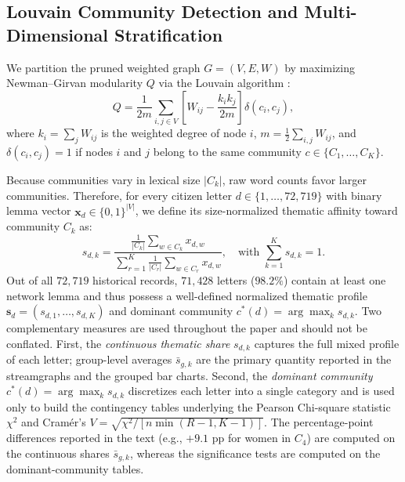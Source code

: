\documentclass[pdflatex,sn-mathphys,iicol]{sn-jnl}
\begin{document}
\subsection{Louvain Community Detection and Multi-Dimensional Stratification}
We partition the pruned weighted graph $G=(V,E,W)$ by maximizing Newman--Girvan modularity $Q$ \citep{newman2006modularity} via the Louvain algorithm \citep{blondel2008fast,cordeiro2016dynamic,traag2019louvain}:
\begin{equation}
    Q = \frac{1}{2m} \sum_{i,j \in V} \left[ W_{ij} - \frac{k_i k_j}{2m} \right] \delta(c_i, c_j),
\end{equation}
where $k_i = \sum_j W_{ij}$ is the weighted degree of node $i$, $m = \frac{1}{2}\sum_{i,j} W_{ij}$, and $\delta(c_i, c_j) = 1$ if nodes $i$ and $j$ belong to the same community $c \in \{C_1, \dots, C_K\}$.

Because communities vary in lexical size $|C_k|$, raw word counts favor larger communities. Therefore, for every citizen letter $d \in \{1, \dots, 72,719\}$ with binary lemma vector $\mathbf{x}_d \in \{0,1\}^{|V|}$, we define its size-normalized thematic affinity toward community $C_k$ as:
\begin{equation}
    s_{d,k} = \frac{\frac{1}{|C_k|} \sum_{w \in C_k} x_{d,w}}{\sum_{r=1}^{K} \frac{1}{|C_r|} \sum_{w \in C_r} x_{d,w}}, \quad \text{with } \sum_{k=1}^{K} s_{d,k} = 1.
\end{equation}
Out of all $72,719$ historical records, $71,428$ letters ($98.2\%$) contain at least one network lemma and thus possess a well-defined normalized thematic profile $\mathbf{s}_d = (s_{d,1}, \dots, s_{d,K})$ and dominant community $c^*(d) = \arg\max_k s_{d,k}$. %
Two complementary measures are used throughout the paper and should not be conflated. First, the \emph{continuous thematic share} $s_{d,k}$ captures the full mixed profile of each letter; group-level averages $\bar{s}_{g,k}$ are the primary quantity reported in the streamgraphs and the grouped bar charts. Second, the \emph{dominant community} $c^*(d) = \arg\max_k s_{d,k}$ discretizes each letter into a single category and is used only to build the contingency tables underlying the Pearson Chi-square statistic $\chi^2$ and Cram\'{e}r's $V = \sqrt{\chi^2 / [n \min(R-1, K-1)]}$. The percentage-point differences reported in the text (e.g., $+9.1$ pp for women in $C_4$) are computed on the continuous shares $\bar{s}_{g,k}$, whereas the significance tests are computed on the dominant-community tables.
\end{document}

